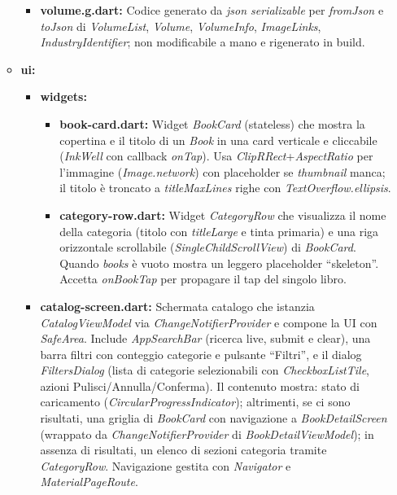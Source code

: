 \documentclass{article}
\begin{document}
\begin{itemize}
\begin{itemize}
\begin{itemize}
      \item \textbf{volume.g.dart:} Codice generato da \textit{json serializable} per \textit{fromJson} e \textit{toJson} di \textit{VolumeList}, \textit{Volume}, \textit{VolumeInfo}, \textit{ImageLinks}, \textit{IndustryIdentifier}; non modificabile a mano e rigenerato in build.
    \end{itemize}
    \item \textbf{ui:}
    \begin{itemize}
      \item \textbf{widgets:}
      \begin{itemize}
        \item \textbf{book-card.dart:} Widget \textit{BookCard} (stateless) che mostra la copertina e il titolo di un \textit{Book} in una card verticale e cliccabile (\textit{InkWell} con callback \textit{onTap}). Usa \textit{ClipRRect}+\textit{AspectRatio} per l’immagine (\textit{Image.network}) con placeholder se \textit{thumbnail} manca; il titolo è troncato a \textit{titleMaxLines} righe con \textit{TextOverflow.ellipsis}.
        \item \textbf{category-row.dart:} Widget \textit{CategoryRow} che visualizza il nome della categoria (titolo con \textit{titleLarge} e tinta primaria) e una riga orizzontale scrollabile (\textit{SingleChildScrollView}) di \textit{BookCard}. Quando \textit{books} è vuoto mostra un leggero placeholder “skeleton”. Accetta \textit{onBookTap} per propagare il tap del singolo libro.
      \end{itemize}
      \item \textbf{catalog-screen.dart:} Schermata catalogo che istanzia \textit{CatalogViewModel} via \textit{ChangeNotifierProvider} e compone la UI con \textit{SafeArea}. Include \textit{AppSearchBar} (ricerca live, submit e clear), una barra filtri con conteggio categorie e pulsante “Filtri”, e il dialog \textit{FiltersDialog} (lista di categorie selezionabili con \textit{CheckboxListTile}, azioni Pulisci/Annulla/Conferma). Il contenuto mostra: stato di caricamento (\textit{CircularProgressIndicator}); altrimenti, se ci sono risultati, una griglia di \textit{BookCard} con navigazione a \textit{BookDetailScreen} (wrappato da \textit{ChangeNotifierProvider} di \textit{BookDetailViewModel}); in assenza di risultati, un elenco di sezioni categoria tramite \textit{CategoryRow}. Navigazione gestita con \textit{Navigator} e \textit{MaterialPageRoute}.
    \end{itemize}

\end{itemize}
\end{itemize}
\end{document}
